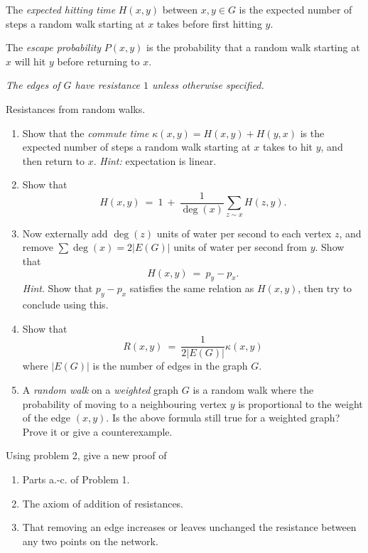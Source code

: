 \documentclass[11pt,fleqn]{book} %
\begin{document}
\begin{definition}
    The \textit{expected hitting time} $H(x,y)$ between $x,y\in G$ is the expected number of steps a random walk starting at $x$ takes before first hitting $y$.
\end{definition}



\begin{definition}
   The \emph{escape probability} $P(x,y)$ is the probability that a random walk starting at $x$ will hit $y$ before returning to $x$.
\end{definition}


\textit{The edges of $G$ have resistance $1$ unless otherwise specified.}


\begin{problem}
  Resistances from random walks.
  \begin{enumerate}[label =\alph*.]
   \item  Show that the \textit{commute time} $\kappa(x,y)=H(x,y)+H(y,x)$ is the expected number of steps a random walk starting at $x$ takes to hit $y$, and then return to $x$. \textit{Hint:} expectation is linear. 
   \item  Show that 
       $$H(x,y) \ = \ 1 \ + \ \frac{1}{\deg(x)}\sum_{z\sim x} H(z,y).$$
       \item  Now externally add $\deg(z)$ units of water per second to each vertex $z$, and remove $\sum \deg(x) = 2|E(G)|$ units of water per second from $y$. Show that 
       $$H(x,y) \ = \  p_y-p_x.$$
    \textit{Hint}. Show that $p_y-p_x$ satisfies the same relation as $H(x,y)$, then try to conclude using this.
   \item Show that 
    $$R(x,y) \ = \ \frac{1}{2|E(G)|} \kappa(x,y) $$
    where $|E(G)|$ is the number of edges in the graph $G$.
    
    
    \item   A \textit{random walk} on a \textit{weighted} graph $G$ is a random walk where the probability of moving to a neighbouring vertex $y$ is proportional to the weight of the edge $(x,y)$. Is the above formula still true for a weighted graph? Prove it or give a counterexample.
  \end{enumerate}
\end{problem}



\begin{problem}
  Using problem 2, give a new proof of 
  \begin{enumerate}[label =\alph*.]
   \item Parts a.-c. of Problem 1. 
   \item The axiom of addition of resistances.
   \item That removing an edge increases or leaves unchanged the resistance between any two points on the network.
  \end{enumerate}
\end{problem}
\end{document}
